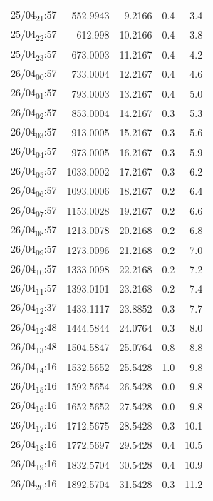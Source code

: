 \documentclass[11pt]{article}
\begin{document}
\begin{table}[htbp]
\begin{tabular}{lrrrr}
25/04\textsubscript{21}:57 & 552.9943 & 9.2166 & 0.4 & 3.4\\[0pt]
25/04\textsubscript{22}:57 & 612.998 & 10.2166 & 0.4 & 3.8\\[0pt]
25/04\textsubscript{23}:57 & 673.0003 & 11.2167 & 0.4 & 4.2\\[0pt]
26/04\textsubscript{00}:57 & 733.0004 & 12.2167 & 0.4 & 4.6\\[0pt]
26/04\textsubscript{01}:57 & 793.0003 & 13.2167 & 0.4 & 5.0\\[0pt]
26/04\textsubscript{02}:57 & 853.0004 & 14.2167 & 0.3 & 5.3\\[0pt]
26/04\textsubscript{03}:57 & 913.0005 & 15.2167 & 0.3 & 5.6\\[0pt]
26/04\textsubscript{04}:57 & 973.0005 & 16.2167 & 0.3 & 5.9\\[0pt]
26/04\textsubscript{05}:57 & 1033.0002 & 17.2167 & 0.3 & 6.2\\[0pt]
26/04\textsubscript{06}:57 & 1093.0006 & 18.2167 & 0.2 & 6.4\\[0pt]
26/04\textsubscript{07}:57 & 1153.0028 & 19.2167 & 0.2 & 6.6\\[0pt]
26/04\textsubscript{08}:57 & 1213.0078 & 20.2168 & 0.2 & 6.8\\[0pt]
26/04\textsubscript{09}:57 & 1273.0096 & 21.2168 & 0.2 & 7.0\\[0pt]
26/04\textsubscript{10}:57 & 1333.0098 & 22.2168 & 0.2 & 7.2\\[0pt]
26/04\textsubscript{11}:57 & 1393.0101 & 23.2168 & 0.2 & 7.4\\[0pt]
26/04\textsubscript{12}:37 & 1433.1117 & 23.8852 & 0.3 & 7.7\\[0pt]
26/04\textsubscript{12}:48 & 1444.5844 & 24.0764 & 0.3 & 8.0\\[0pt]
26/04\textsubscript{13}:48 & 1504.5847 & 25.0764 & 0.8 & 8.8\\[0pt]
26/04\textsubscript{14}:16 & 1532.5652 & 25.5428 & 1.0 & 9.8\\[0pt]
26/04\textsubscript{15}:16 & 1592.5654 & 26.5428 & 0.0 & 9.8\\[0pt]
26/04\textsubscript{16}:16 & 1652.5652 & 27.5428 & 0.0 & 9.8\\[0pt]
26/04\textsubscript{17}:16 & 1712.5675 & 28.5428 & 0.3 & 10.1\\[0pt]
26/04\textsubscript{18}:16 & 1772.5697 & 29.5428 & 0.4 & 10.5\\[0pt]
26/04\textsubscript{19}:16 & 1832.5704 & 30.5428 & 0.4 & 10.9\\[0pt]
26/04\textsubscript{20}:16 & 1892.5704 & 31.5428 & 0.3 & 11.2\\[0pt]

\end{tabular}
\end{table}
\end{document}
